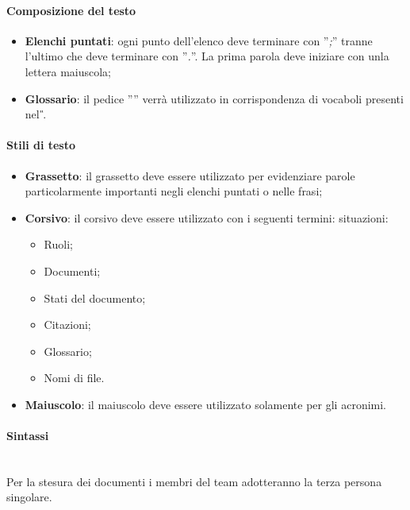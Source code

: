 	\paragraph{Composizione del testo}
	\begin{itemize}
		\item \textbf{Elenchi puntati}: ogni punto dell'elenco deve terminare con ''\emph{;}''
		tranne l'ultimo che deve terminare con  ''\emph{.}''. La prima parola deve iniziare con unla lettera maiuscola;
		\item \textbf{Glossario}: il pedice '''' verrà utilizzato in corrispondenza di vocaboli presenti nel \textit{\G}.
	\end{itemize}
	\paragraph{Stili di testo}
	\begin{itemize}
		\item \textbf{Grassetto}: il grassetto deve essere utilizzato per evidenziare parole
		particolarmente importanti negli elenchi puntati o nelle frasi;
		\item \textbf{Corsivo}: il corsivo deve essere utilizzato con i seguenti termini:
		situazioni:
		\begin{itemize}
			\item Ruoli;
			\item Documenti;
			\item Stati del documento;
			\item Citazioni;
			\item Glossario;
			\item Nomi di file.
		\end{itemize}
		\item \textbf{Maiuscolo}: il maiuscolo deve essere utilizzato solamente per gli acronimi.
	\end{itemize}
	\paragraph{Sintassi}
	~\\Per la stesura dei documenti i membri del team adotteranno la terza persona singolare.
